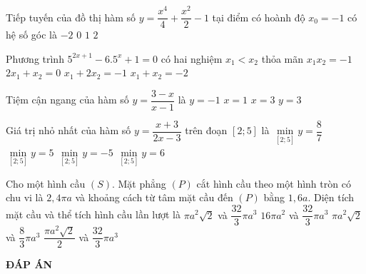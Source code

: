 \begin{ex}%
Tiếp tuyến của đồ thị hàm số $y=\dfrac{x^{4}}{4}+\dfrac{x^{2}}{2}-1$ tại điểm có hoành độ $x_{0}=-1$ có hệ số góc là
\choice
{\True $-2$}
{$0$}
{$1$}
{$2$}
\end{ex}
\begin{ex}%
Phương trình $5^{2x+1}-6.5^{x}+1=0$ có hai nghiệm $x_{1}<x_{2}$ thỏa mãn
\choice
{\True $x_{1}x_{2}=-1$}
{$2x_{1}+x_{2}=0$}
{$x_{1}+2x_{2}=-1$}
{$x_{1}+x_{2}=-2$}
\end{ex}
\begin{ex}%
Tiệm cận ngang của hàm số $y=\dfrac{3-x}{x-1}$ là
\choice
{\True $y=-1$}
{$x=1$}
{$x=3$}
{$y=3$}
\end{ex}
\begin{ex}%
Giá trị nhỏ nhất của hàm số $y=\dfrac{x+3}{2x-3}$ trên đoạn $[2;5]$ là
\choice
{\True $\min\limits_{[2;5]}y=\dfrac{8}{7}$}
{$\min\limits_{[2;5]}y=5$}
{$\min\limits_{[2;5]}y=-5$}
{$\min\limits_{[2;5]}y=6$}
\end{ex}
\begin{ex}%
Cho một hình cầu $(S)$. Mặt phẳng $(P)$ cắt hình cầu theo một hình tròn có chu vi là $2,4\pi a$ và khoảng cách từ tâm mặt cầu đến $(P)$ bằng $1,6a$. Diện tích mặt cầu và thể tích hình cầu lần lượt là
\choice
{$\pi a^{2}\sqrt{2}$ và $\dfrac{32}{3}\pi a^{3}$}
{\True $16\pi a^{2}$ và $\dfrac{32}{3}\pi a^{3}$}
{$\pi a^{2}\sqrt{2}$ và $\dfrac{8}{3}\pi a^{3}$}
{$\dfrac{\pi a^{2}\sqrt{2}}{2}$ và $\dfrac{32}{3}\pi a^{3}$}
\end{ex}

\newpage
\begin{center}
	\textbf{ĐÁP ÁN}
\end{center}
\begin{multicols}{10}
	 
\end{multicols}